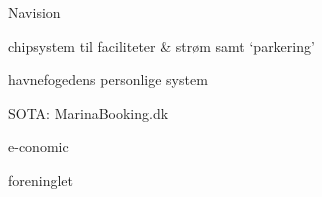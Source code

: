 Navision

chipsystem til faciliteter & strøm samt `parkering'

havnefogedens personlige system

SOTA:
MarinaBooking.dk

e-conomic

foreninglet

